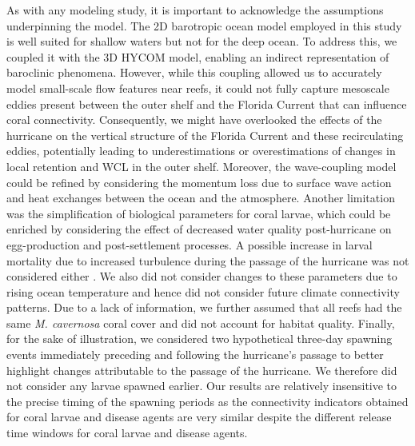\documentclass[fleqn,10pt]{wlscirep}
\begin{document}
As with any modeling study, it is important to acknowledge the assumptions underpinning the model. The 2D barotropic ocean model employed in this study is well suited for shallow waters but not for the deep ocean. To address this, we coupled it with the 3D HYCOM model, enabling an indirect representation of baroclinic phenomena. However, while this coupling allowed us to accurately model small-scale flow features near reefs, it could not fully capture mesoscale eddies present between the outer shelf and the Florida Current that can influence coral connectivity. Consequently, we might have overlooked the effects of the hurricane on the vertical structure of the Florida Current \citep{ezer2018interaction} and these recirculating eddies, potentially leading to underestimations or overestimations of changes in local retention and WCL in the outer shelf. Moreover, the wave-coupling model could be refined by considering the momentum loss due to surface wave action and heat exchanges between the ocean and the atmosphere. Another limitation was the simplification of biological parameters for coral larvae, which could be enriched by considering the effect of decreased water quality post-hurricane on egg-production and post-settlement processes. A possible increase in larval mortality due to increased turbulence during the passage of the hurricane was not considered either \citep{heyward2012}. We also did not consider changes to these parameters due to rising ocean temperature and hence did not consider future climate connectivity patterns. Due to a lack of information, we further assumed that all reefs had the same \emph{M. cavernosa} coral cover and did not account for habitat quality. Finally, for the sake of illustration, we considered two hypothetical three-day spawning events immediately preceding and following the hurricane's passage to better highlight changes attributable to the passage of the hurricane. We therefore did not consider any larvae spawned earlier. Our results are relatively insensitive to the precise timing of the spawning periods as the connectivity indicators obtained for coral larvae and disease agents are very similar despite the different release time windows for coral larvae and disease agents.
\end{document}
